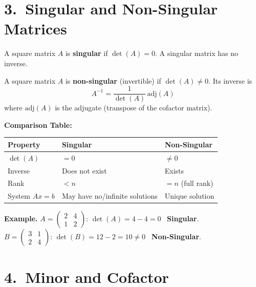 \documentclass[12pt]{article}
\begin{document}
\section{3.\ Singular and Non-Singular Matrices}

\begin{defbox}
A square matrix $A$ is \textbf{singular} if $\det(A) = 0$. A singular matrix has no inverse.
\end{defbox}

\begin{defbox}
A square matrix $A$ is \textbf{non-singular} (invertible) if $\det(A) \neq 0$. Its inverse is
\[
A^{-1} = \frac{1}{\det(A)}\,\text{adj}(A)
\]
where $\text{adj}(A)$ is the adjugate (transpose of the cofactor matrix).
\end{defbox}

\begin{tcolorbox}[enhanced, colback=amberbg, colframe=amberclr, arc=4pt, boxrule=1pt]
\textbf{Comparison Table:}

\vspace{4pt}
\begin{tabular}{lll}
\toprule
\textbf{Property} & \textbf{Singular} & \textbf{Non-Singular} \\
\midrule
$\det(A)$ & $= 0$ & $\neq 0$ \\
Inverse & Does not exist & Exists \\
Rank & $< n$ & $= n$ (full rank) \\
System $Ax=b$ & May have no/infinite solutions & Unique solution \\
\bottomrule
\end{tabular}
\end{tcolorbox}

\textbf{Example.}
$A = \begin{pmatrix}2&4\\1&2\end{pmatrix}$: $\det(A) = 4-4=0$ \textrightarrow\ \textbf{Singular}.\\[4pt]
$B = \begin{pmatrix}3&1\\2&4\end{pmatrix}$: $\det(B) = 12-2=10 \neq 0$ \textrightarrow\ \textbf{Non-Singular}.

\section{4.\ Minor and Cofactor}
\end{document}
